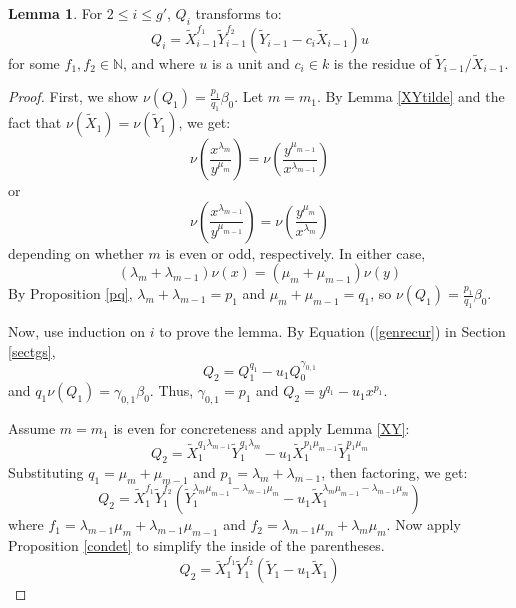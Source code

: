 \documentclass[11pt]{amsart}
\theoremstyle{definition}
\newtheorem{lem}[thm]{Lemma}
\begin{document}
{\begin{lem} \label{strict}
For $2\leq i\leq g'$, $Q_i$ transforms to:
\begin{equation*}
Q_i=\tilde X_{i-1}^{f_1}\tilde Y_{i-1}^{f_2}\left(\tilde Y_{i-1}-c_i\tilde X_{i-1}\right)u
\end{equation*}
for some $f_1,f_2\in\mathbb{N}$, and where $u$ is a unit and $c_i\in k$ is the residue of $\tilde Y_{i-1}/\tilde X_{i-1}$.
\end{lem}

\begin{proof}
First, we show $\displaystyle \nu(Q_1)=\frac{p_1}{q_1}\beta_0$. Let $m=m_1$. By Lemma \ref{XYtilde} and the fact that $\nu(\tilde X_1)=\nu(\tilde Y_1)$, we get:
\begin{equation*}
\nu\left(\frac{x^{\lambda_m}}{y^{\mu_m}}\right)=\nu\left(\frac{y^{\mu_{m-1}}}{x^{\lambda_{m-1}}}\right)
\end{equation*}
or
\begin{equation*}
\nu\left(\frac{x^{\lambda_{m-1}}}{y^{\mu_{m-1}}}\right)=\nu\left(\frac{y^{\mu_{m}}}{x^{\lambda_{m}}}\right)
\end{equation*}
depending on whether $m$ is even or odd, respectively. In either case,
\begin{equation*}
\left(\lambda_m+\lambda_{m-1}\right)\nu(x)=\left(\mu_m+\mu_{m-1}\right)\nu(y)
\end{equation*}
By Proposition \ref{pq}, $\lambda_m+\lambda_{m-1}=p_1$ and $\mu_m+\mu_{m-1}=q_1$, so $\displaystyle \nu(Q_1)=\frac{p_1}{q_1}\beta_0$.

Now, use induction on $i$ to prove the lemma. By Equation (\ref{genrecur}) in Section \ref{sectgs},
\begin{equation*}
Q_2=Q_1^{q_1}-u_1Q_0^{\gamma_{0,1}}
\end{equation*}
and $\displaystyle q_1\nu(Q_1) = \gamma_{0,1} \beta_0$. Thus, $\gamma_{0,1}=p_1$ and $\displaystyle Q_2 = y^{q_1} - u_1x^{p_1}$.

Assume $m=m_1$ is even for concreteness and apply Lemma \ref{XY}:
\begin{equation*}
Q_2 = \tilde X_1^{q_1\lambda_{m-1}} \tilde Y_1^{q_1\lambda_{m}} - u_1 \tilde X_1^{p_1\mu_{m-1}} \tilde Y_1^{p_1\mu_{m}}
\end{equation*}
Substituting $q_1 = \mu_m + \mu_{m-1}$ and $p_1=\lambda_m + \lambda_{m-1}$, then factoring, we get:
\begin{equation*}
Q_2 = \tilde X_1^{f_1} \tilde Y_1^{f_2}\left(\tilde Y_1^{\lambda_m\mu_{m-1}-\lambda_{m-1}\mu_m} -u_1 \tilde X_1^{\lambda_m\mu_{m-1}-\lambda_{m-1}\mu_m} \right)
\end{equation*}
where $f_1=\lambda_{m-1}\mu_m+\lambda_{m-1}\mu_{m-1}$ and $f_2=\lambda_{m-1}\mu_m+\lambda_m\mu_m$.
Now apply Proposition \ref{condet} to simplify the inside of the parentheses.
\begin{equation*}
Q_2 = \tilde X_1^{f_1} \tilde Y_1^{f_2}\left(\tilde Y_1 -u_1 \tilde X_1 \right)
\end{equation*}


\end{proof}}
\end{document}
